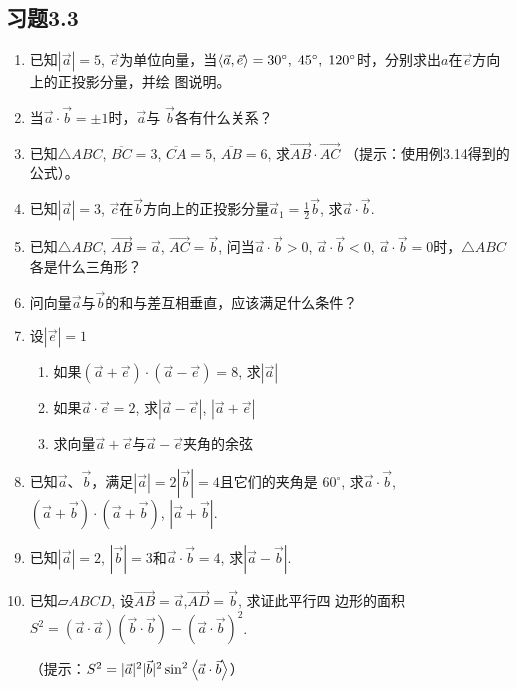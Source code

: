\subsection*{习题3.3}
\begin{enumerate}
    \item  已知$|\vec{a}|=5$, $\vec{e}$为单位向量，当$\left\langle \vec{a},\vec{e} \right\rangle=30^{\circ},\; 45^{\circ},\; 120^{\circ}$时，分别求出$a$在$\vec{e}$方向上的正投影分量，并绘
    图说明。
    \item  当$\vec{a}\cdot \vec{b}=\pm 1$时，$\vec{a}$与
    $\vec{b}$各有什么关系？
    \item  已知$\triangle ABC$, $\overline{BC}=3$, $\overline{CA}=5$, $\overline{AB}=6$, 求$\Vec{A B}\cdot \Vec{AC}$
    （提示：使用例3.14得到的公式）。
    \item  已知$|\vec{a}|=3$, $\vec{c}$在$\vec{b}$方向上的正投影分量$\vec{a}_1=\frac{1}{2}\vec{b}$,
    求$\vec{a}\cdot \vec{b}$.
    \item  已知$\triangle ABC$, $\Vec{AB}=\vec{a}$, $\Vec{AC}=\vec{b}$, 问当$\vec{a}\cdot \vec{b}>0$, $\vec{a}\cdot \vec{b}<0$, $\vec{a}\cdot \vec{b}=0$时，$\triangle ABC$各是什么三角形？

    \item  问向量$\vec{a}$与$\vec{b}$的和与差互相垂直，应该满足什么条件？
    \item  设$|\vec{e}|=1$
\begin{enumerate}
    \item 如果$(\vec{a}+\vec{e})\cdot (\vec{a}-\vec{e})=8$, 求$|\vec{a}|$
    \item 如果$\vec{a}\cdot \vec{e}=2$, 求$|\vec{a}-\vec{e}|$, $|\vec{a}+\vec{e}|$
    \item 求向量$\vec{a}+\vec{e}$与$\vec{a}-\vec{e}$夹角的余弦
\end{enumerate}

    \item  已知$\vec{a}$、$\vec{b}$，满足$|\vec{a}|=2|\vec{b}|=4$且它们的夹角是
    $60^{\circ}$, 求$\vec{a}\cdot \vec{b}$, $(\vec{a}+\vec{b})\cdot (\vec{a}+\vec{b})$, $|\vec{a}+\vec{b}|$.
    \item  已知$|\vec{a}|=2$, $|\vec{b}|=3$和$\vec{a}\cdot\vec{b}=4$, 求$|\vec{a}-\vec{b}|$.
    \item  已知$\parallelogram ABCD$, 设$\Vec{AB}=\vec{a}$,$\Vec{AD}=\vec{b}$, 求证此平行四
    边形的面积 $S^2=(\vec{a}\cdot \vec{a})(\vec{b}\cdot \vec{b})-(\vec{a}\cdot \vec{b})^2$.

    （提示：$S^2=|\vec{a}|^2|\vec{b}|^2\sin^2 \left\langle \vec{a}\cdot \vec{b} \right\rangle$）
\end{enumerate}

